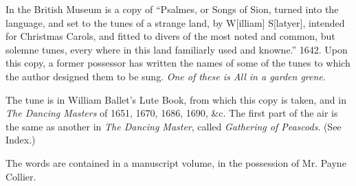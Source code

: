 In the British Museum is a copy of “Psalmes, or Songs of Sion, turned into
the language, and set to the tunes of a strange land, by W[illiam] S[latyer],
intended for Christmas Carols, and fitted to divers of the most noted and common,
but solemne tunes, every where in this land familiarly used and knowne.” 1642.
Upon this copy, a former possessor has written the names of some of the tunes to
which the author designed them to be sung. \textit{One of these is All in a garden grene}.

The tune is in William Ballet’s Lute Book, from which this copy is taken, and
in \textit{The Dancing Masters} of 1651, 1670, 1686, 1690, \&c. The first part of the
air is the same as another in \textit{The Dancing Master}, called \textit{Gathering of Peascods}.
(See Index.)

The words are contained in a manuscript volume, in the possession of Mr.
Payne Collier.

\noindent\begin{minipage}{\textwidth}
\bigskip
\smallskip

\end{minipage}

\pagebreak

